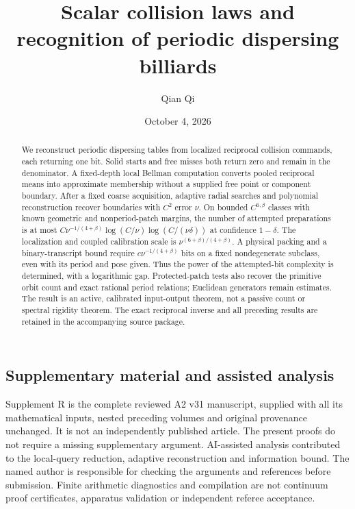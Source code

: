 \documentclass[11pt]{amsart}
\title[Scalar collision laws]{Scalar collision laws and recognition of periodic dispersing billiards}
\author{Qian Qi}
\date{October 4, 2026}
\theoremstyle{definition}\newtheorem{definition}[theorem]{Definition}
\theoremstyle{remark}\newtheorem{remark}[theorem]{Remark}
\numberwithin{equation}{section}
\begin{document}
\begin{abstract}
We reconstruct periodic dispersing tables from localized reciprocal
collision commands, each returning one bit. Solid starts and free misses
both return zero and remain in the denominator. A fixed-depth local
Bellman computation converts pooled reciprocal means into approximate
membership without a supplied free point or component boundary. After
a fixed coarse acquisition, adaptive radial searches and polynomial
reconstruction recover boundaries with $C^2$ error $\nu$. On bounded
$C^{6,\beta}$ classes with known geometric and nonperiod-patch margins,
the number of attempted preparations is at most
$C\nu^{-1/(4+\beta)}\log(C/\nu)\log(C/(\nu\delta))$
at confidence $1-\delta$. The localization and coupled calibration scale
is $\nu^{(6+\beta)/(4+\beta)}$. A physical packing and a binary-transcript
bound require $c\nu^{-1/(4+\beta)}$ bits on a fixed nondegenerate subclass,
even with its period and pose given. Thus the power of the attempted-bit
complexity is determined, with a logarithmic gap. Protected-patch tests
also recover the primitive orbit count and exact rational period
relations; Euclidean generators remain estimates. The result is an
active, calibrated input-output theorem, not a passive count or spectral
rigidity theorem. The exact reciprocal inverse and all preceding results
are retained in the accompanying source package.
\end{abstract}
\maketitle






\subsection*{Supplementary material and assisted analysis}
Supplement R is the complete reviewed A2 v31 manuscript, supplied with
all its mathematical inputs, nested preceding volumes and original
provenance unchanged. It is not an independently published article.
The present proofs do not require a missing supplementary argument.
AI-assisted analysis contributed to the local-query reduction, adaptive
reconstruction and information bound. The named author is responsible
for checking the arguments and references before submission. Finite
arithmetic diagnostics and compilation are not continuum proof
certificates, apparatus validation or independent referee acceptance.

\end{document}
